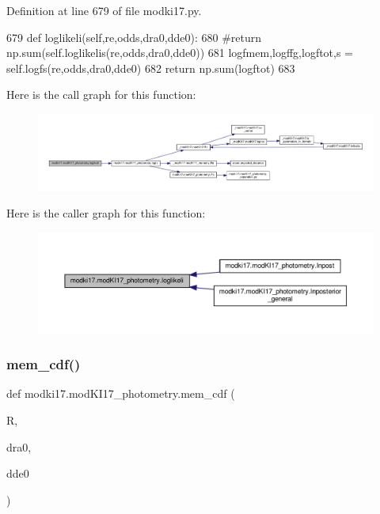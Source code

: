 Definition at line 679 of file modki17.\+py.


\begin{DoxyCode}
679     \textcolor{keyword}{def }loglikeli(self,re,odds,dra0,dde0):
680         \textcolor{comment}{#return np.sum(self.loglikelis(re,odds,dra0,dde0))}
681         logfmem,logffg,logftot,s = self.logfs(re,odds,dra0,dde0)
682         \textcolor{keywordflow}{return} np.sum(logftot)
683     
\end{DoxyCode}
Here is the call graph for this function\+:\nopagebreak
\begin{figure}[H]
\begin{center}
\leavevmode
\includegraphics[width=350pt]{dd/db2/classmodki17_1_1modKI17__photometry_a1c7a3d4028e066698b0b379ba46f61d6_cgraph}
\end{center}
\end{figure}
Here is the caller graph for this function\+:\nopagebreak
\begin{figure}[H]
\begin{center}
\leavevmode
\includegraphics[width=350pt]{dd/db2/classmodki17_1_1modKI17__photometry_a1c7a3d4028e066698b0b379ba46f61d6_icgraph}
\end{center}
\end{figure}
\mbox{\label{classmodki17_1_1modKI17__photometry_ae1dc87c123abbd71228d68b964469937}} 
\subsubsection{\texorpdfstring{mem\+\_\+cdf()}{mem\_cdf()}}
{\footnotesize\ttfamily def modki17.\+mod\+K\+I17\+\_\+photometry.\+mem\+\_\+cdf (\begin{DoxyParamCaption}\item[{}]{R,  }\item[{}]{dra0,  }\item[{}]{dde0 }\end{DoxyParamCaption})}



